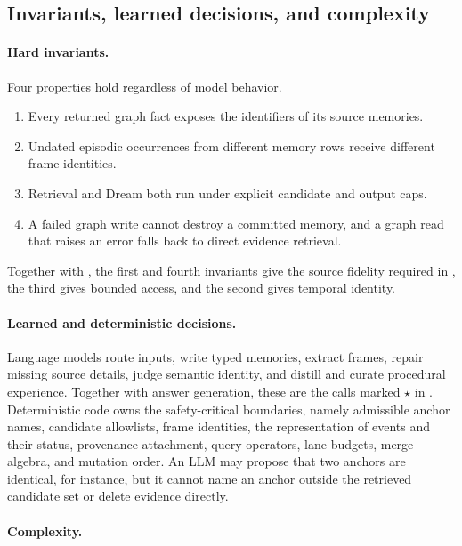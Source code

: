 \subsection{Invariants, learned decisions, and complexity}
\label{app:method-invariants}\label{app:method-complexity}

\paragraph{Hard invariants.}
Four properties hold regardless of model behavior.
\begin{enumerate}[leftmargin=*,nosep]
    \item Every returned graph fact exposes the identifiers of its source
    memories.
    \item Undated episodic occurrences from different memory rows receive
    different frame identities.
    \item Retrieval and Dream both run under explicit candidate and output caps.
    \item A failed graph write cannot destroy a committed memory, and a graph
    read that raises an error falls back to direct evidence retrieval.
\end{enumerate}
Together with , the first and fourth invariants give
the source fidelity required in , the third gives
bounded access, and the second gives temporal identity.

\paragraph{Learned and deterministic decisions.}
Language models route inputs, write typed memories, extract frames, repair
missing source details, judge semantic identity, and distill and curate
procedural experience. Together with answer generation, these are the calls
marked \(\star\) in . Deterministic code owns the
safety-critical boundaries, namely admissible anchor names, candidate
allowlists, frame identities, the representation of events and their status,
provenance attachment, query operators, lane budgets, merge algebra, and
mutation order. An LLM may propose that two anchors are identical, for instance,
but it cannot name an anchor outside the retrieved candidate set or delete
evidence directly.

\paragraph{Complexity.}


